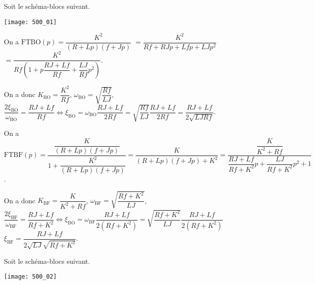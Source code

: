 \normaltrue \difficilefalse \tdifficilefalse
\correctiontrue


\setcounter{question}{0}

\ifcorrection
\else
{}
\fi


\ifprof 
\else
Soit le schéma-blocs suivant.
\begin{center}
\texttt{[image: 500\_01]}
\end{center}
 \fi
 
\ifprof
On a $\text{FTBO}(p)=\dfrac{K^2}{\left(R+Lp\right)\left(f+Jp\right)}$
$=\dfrac{K^2}{Rf+RJp+Lfp+LJp^2}$
$=\dfrac{K^2}{Rf\left(1+p\dfrac{RJ+Lf}{Rf}+\dfrac{LJ}{Rf}p^2\right)}$.

On a donc $K_{\text{BO}}=\dfrac{K^2}{Rf}$, 
$\omega_{\text{BO}} = \sqrt{\dfrac{Rf}{LJ}}$,
$\dfrac{2\xi_{\text{BO}} }{\omega_{\text{BO}}}=\dfrac{RJ+Lf}{Rf} \Leftrightarrow
\xi_{\text{BO}} =\omega_{\text{BO}}\dfrac{RJ+Lf}{2Rf}
=\sqrt{\dfrac{Rf}{LJ}}\dfrac{RJ+Lf}{2Rf}
=\dfrac{RJ+Lf}{2\sqrt{LJRf}}$.
\else 
\fi

\ifprof
On a $\text{FTBF}(p)=\dfrac{\dfrac{K}{\left(R+Lp\right)\left(f+Jp\right)}}{1+\dfrac{K^2}{\left(R+Lp\right)\left(f+Jp\right)}}
=\dfrac{K}{\left(R+Lp\right)\left(f+Jp\right)+K^2}
=\dfrac{\dfrac{K}{K^2+Rf}}{\dfrac{RJ+Lf}{Rf+K^2}p+\dfrac{LJ}{Rf+K^2}p^2+1}$.



On a donc $K_{\text{BF}}=\dfrac{K}{K^2+Rf}$, 
$\omega_{\text{BF}} = \sqrt{\dfrac{Rf+K^2}{LJ}}$,
$\dfrac{2\xi_{\text{BF}} }{\omega_{\text{BF}}}=\dfrac{RJ+Lf}{Rf+K^2} \Leftrightarrow
\xi_{\text{BO}} =\omega_{\text{BF}}\dfrac{RJ+Lf}{2\left(Rf+K^2\right)}
=\sqrt{\dfrac{Rf+K^2}{LJ}}\dfrac{RJ+Lf}{2\left(Rf+K^2\right)}$
%
$\xi_{\text{BF}}=\dfrac{RJ+Lf}{2\sqrt{LJ}\sqrt{Rf+K^2}}$.
\else 
\fi

\ifprof 
\else
Soit le schéma-blocs suivant.
\begin{center}
\texttt{[image: 500\_02]}
\end{center}
 \fi
 

